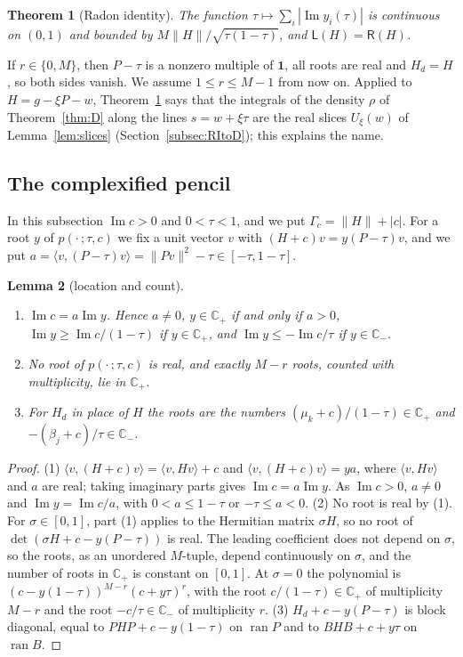 \documentclass[11pt]{amsart}
\newtheorem{theorem}{Theorem}[section]
\newtheorem{lemma}[theorem]{Lemma}
\theoremstyle{definition}
\theoremstyle{remark}
\numberwithin{equation}{section}
\newcommand{\C}{\mathbb{C}}
\renewcommand{\Im}{\operatorname{Im}}
\newcommand{\one}{\mathbf{1}}
\newcommand{\ip}[2]{\langle #1,#2\rangle}
\begin{document}
\begin{theorem}[Radon identity]\label{thm:RI}
The function $\tau\mapsto\sum_i|\Im y_i(\tau)|$ is continuous on $(0,1)$ and bounded by $M\|H\|/\sqrt{\tau(1-\tau)}$,
and $\mathsf L(H)=\mathsf R(H)$.
\end{theorem}

If $r\in\{0,M\}$, then $P-\tau$ is a nonzero multiple of $\one$, all roots are real and $H_d=H$, so both sides vanish.
We assume $1\le r\le M-1$ from now on. Applied to $H=g-\xi P-w$, Theorem~\ref{thm:RI} says that the integrals of the
density $\rho$ of Theorem~\ref{thm:D} along the lines $s=w+\xi\tau$ are the real slices $U_\xi(w)$ of
Lemma~\ref{lem:slices} (Section~\ref{subsec:RItoD}); this explains the name.

\subsection{The complexified pencil}
In this subsection $\Im c>0$ and $0<\tau<1$, and we put $\Gamma_c=\|H\|+|c|$. For a root $y$ of $p(\cdot\,;\tau,c)$ we
fix a unit vector $v$ with $(H+c)v=y(P-\tau)v$, and we put $a=\ip v{(P-\tau)v}=\|Pv\|^2-\tau\in[-\tau,1-\tau]$.

\begin{lemma}[location and count]\label{lem:RIa}
\begin{enumerate}
\item $\Im c=a\Im y$. Hence $a\ne0$, $y\in\C_+$ if and only if $a>0$, $\Im y\ge\Im c/(1-\tau)$ if $y\in\C_+$, and
$\Im y\le-\Im c/\tau$ if $y\in\C_-$.
\item No root of $p(\cdot\,;\tau,c)$ is real, and exactly $M-r$ roots, counted with multiplicity, lie in $\C_+$.
\item For $H_d$ in place of $H$ the roots are the numbers $(\mu_k+c)/(1-\tau)\in\C_+$ and $-(\beta_j+c)/\tau\in\C_-$.
\end{enumerate}
\end{lemma}

\begin{proof}
(1) $\ip v{(H+c)v}=\ip v{Hv}+c$ and $\ip v{(H+c)v}=ya$, where $\ip v{Hv}$ and $a$ are real; taking imaginary parts gives
$\Im c=a\Im y$. As $\Im c>0$, $a\ne0$ and $\Im y=\Im c/a$, with $0<a\le1-\tau$ or $-\tau\le a<0$.
(2) No root is real by (1). For $\sigma\in[0,1]$, part (1) applies to the Hermitian matrix $\sigma H$, so no root of
$\det(\sigma H+c-y(P-\tau))$ is real. The leading coefficient does not depend on $\sigma$, so the roots, as an unordered
$M$-tuple, depend continuously on $\sigma$, and the number of roots in $\C_+$ is constant on $[0,1]$. At $\sigma=0$ the
polynomial is $(c-y(1-\tau))^{M-r}(c+y\tau)^r$, with the root $c/(1-\tau)\in\C_+$ of multiplicity $M-r$ and the root
$-c/\tau\in\C_-$ of multiplicity $r$.
(3) $H_d+c-y(P-\tau)$ is block diagonal, equal to $PHP+c-y(1-\tau)$ on $\operatorname{ran}P$ and to $BHB+c+y\tau$ on
$\operatorname{ran}B$.
\end{proof}
\end{document}
